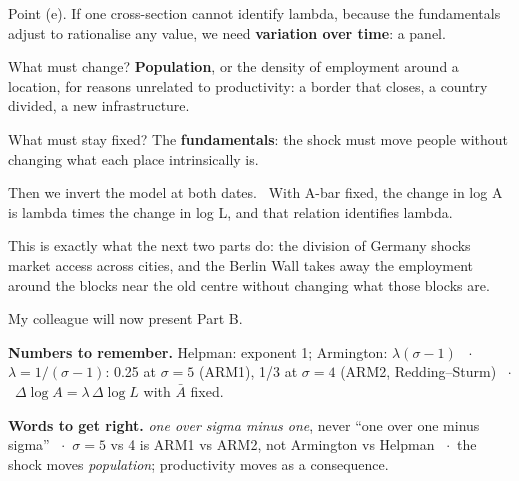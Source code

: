 \begin{say}
 Point (e). If one cross-section cannot identify lambda, because the fundamentals adjust to rationalise any value, we need \textbf{variation over time}: a panel.

 What must change? \textbf{Population}, or the density of employment around a location, for reasons unrelated to productivity: a border that closes, a country divided, a new infrastructure.

 What must stay fixed? The \textbf{fundamentals}: the shock must move people without changing what each place intrinsically is.

 Then we invert the model at both dates. \pause\ With A-bar fixed, the change in log A is lambda times the change in log L, and that relation identifies lambda.

 This is exactly what the next two parts do: the division of Germany shocks market access across cities, and the Berlin Wall takes away the employment around the blocks near the old centre without changing what those blocks are.

 My colleague will now present Part B.
\end{say}

\vspace{6pt}
\begin{tcolorbox}[colback=tint,colframe=tint,arc=0pt]
\small\textbf{Numbers to remember.} Helpman: exponent 1; Armington: $\lambda(\sigma-1)$ \ $\cdot$\ $\lambda = 1/(\sigma-1)$: 0.25 at $\sigma=5$ (ARM1), 1/3 at $\sigma=4$ (ARM2, Redding--Sturm) \ $\cdot$\ $\Delta\log A = \lambda\,\Delta\log L$ with $\bar A$ fixed.

\textbf{Words to get right.} \emph{one over sigma minus one}, never ``one over one minus sigma'' \ $\cdot$\ $\sigma=5$ vs 4 is ARM1 vs ARM2, not Armington vs Helpman \ $\cdot$\ the shock moves \emph{population}; productivity moves as a consequence.
\end{tcolorbox}

